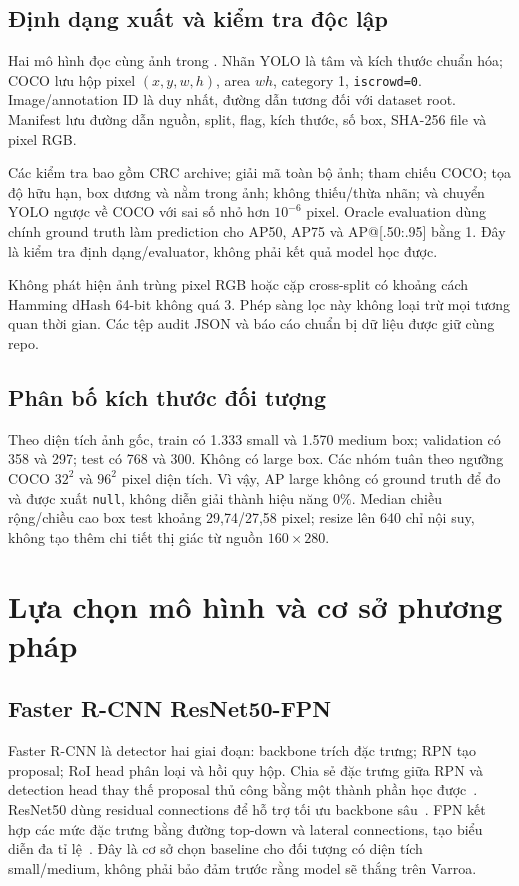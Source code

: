 \documentclass[a4paper,10pt,twocolumn]{article}
\newcommand{\FR}{Faster R-CNN}
\begin{document}
\subsection{Định dạng xuất và kiểm tra độc lập}
Hai mô hình đọc cùng ảnh trong . Nhãn YOLO là tâm và
kích thước chuẩn hóa; COCO lưu hộp pixel $(x,y,w,h)$, area $wh$, category 1,
\texttt{iscrowd=0}. Image/annotation ID là duy nhất, đường dẫn tương đối với dataset root.
Manifest lưu đường dẫn nguồn, split, flag, kích thước, số box, SHA-256 file và pixel RGB.

Các kiểm tra bao gồm CRC archive; giải mã toàn bộ ảnh; tham chiếu COCO; tọa độ hữu hạn,
box dương và nằm trong ảnh; không thiếu/thừa nhãn; và chuyển YOLO ngược về COCO với
sai số nhỏ hơn $10^{-6}$ pixel. Oracle evaluation dùng chính ground truth làm prediction
cho AP50, AP75 và AP@[.50:.95] bằng 1. Đây là kiểm tra định dạng/evaluator, không phải
kết quả model học được.

Không phát hiện ảnh trùng pixel RGB hoặc cặp cross-split có khoảng cách Hamming
dHash 64-bit không quá 3. Phép sàng lọc này không loại trừ mọi tương quan thời gian.
Các tệp audit JSON và báo cáo chuẩn bị dữ liệu được giữ cùng repo.

\subsection{Phân bố kích thước đối tượng}
Theo diện tích ảnh gốc, train có 1.333 small và 1.570 medium box; validation có
358 và 297; test có 768 và 300. Không có large box. Các nhóm tuân theo ngưỡng COCO
$32^2$ và $96^2$ pixel diện tích. Vì vậy, AP large không có ground truth để đo và được
xuất \texttt{null}, không diễn giải thành hiệu năng 0\%.
Median chiều rộng/chiều cao box test khoảng 29,74/27,58 pixel; resize lên 640 chỉ
nội suy, không tạo thêm chi tiết thị giác từ nguồn $160\times280$.

\section{Lựa chọn mô hình và cơ sở phương pháp}
\subsection{Faster R-CNN ResNet50-FPN}
\FR{} là detector hai giai đoạn: backbone trích đặc trưng; RPN tạo proposal;
RoI head phân loại và hồi quy hộp. Chia sẻ đặc trưng giữa RPN và detection head
thay thế proposal thủ công bằng một thành phần học được~\cite{fasterrcnn}.
ResNet50 dùng residual connections để hỗ trợ tối ưu backbone sâu~\cite{resnet}.
FPN kết hợp các mức đặc trưng bằng đường top-down và lateral connections, tạo
biểu diễn đa tỉ lệ~\cite{fpn}. Đây là cơ sở chọn baseline cho đối tượng có diện tích
small/medium, không phải bảo đảm trước rằng model sẽ thắng trên Varroa.
\end{document}
